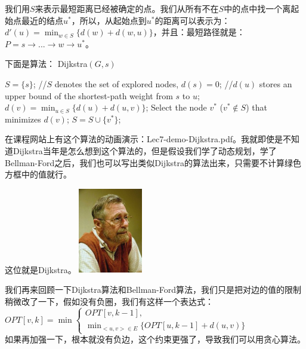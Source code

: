 	 我们用$S$来表示最短距离已经被确定的点。我们从所有不在$S$中的点中找一个离起始点最近的结点$u^\ast$，所以，从起始点到$u^\ast$的距离可以表示为： $d'(u)=\min_{w\in S}\{d(w)+d(w, u)\}$，并且：最短路径就是：$P=s\rightarrow...\rightarrow w \rightarrow u^*$。
	 
	 下面是算法：
	 {\sc Dijkstra}$(G, s )$
	 \begin{algorithmic}[1]
	 	\STATE $S=\{s\}$; //$S$ denotes the set of explored nodes,
	 	\STATE $d(s)=0$; //$d(u)$ stores an upper bound of the shortest-path weight from $s$ to $u$;
	 	\ENDFOR
	 	\STATE  $d(v)=\min_{u\in S}\{d(u)+d(u,v)\}$;
	 	\ENDFOR 
	 	\STATE Select the node $v^*$ ($v^* \notin S$) that minimizes $d(v)$;
	 	\STATE $S=S \cup \{v^*\}$;
	 	\ENDWHILE
	 \end{algorithmic}
	 在课程网站上有这个算法的动画演示：Lec7-demo-Dijkstra.pdf。我就即使是不知道Dijkstra当年是怎么想到这个算法的，但是假设我们学了动态规划，学了Bellman-Ford之后，我们也可以写出类似Dijkstra的算法出来，只需要不计算绿色方框中的值就行。
	 
	 这位就是Dijkstra。
	 \includegraphics[width=1.1in]{Dijkstra.jpg}
	 
	 我们再来回顾一下Dijkstra算法和Bellman-Ford算法，我们只是把对边的值的限制稍微改了一下，假如没有负圈，我们有这样一个表达式：
	 $OPT[v, k] = \min \begin{cases}
	 OPT[ v, k-1], \\
	 \min_{<u,v>\in E} \{OPT[u, k-1 ] + d(u,v) \} 
	 \end{cases}$\\
	 如果再加强一下，根本就没有负边，这个约束更强了，导致我们可以用贪心算法。
	 

